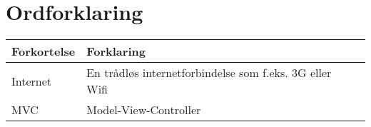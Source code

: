 \chapter*{Ordforklaring}

\begin{tabularx}{\textwidth}{l l X} \hline
	\textbf{Forkortelse}  & \textbf{Forklaring} \\ \hline
	Internet&  En trådløs internetforbindelse som f.eks. 3G eller Wifi& \\
	MVC& Model-View-Controller& \\
	
\end{tabularx}